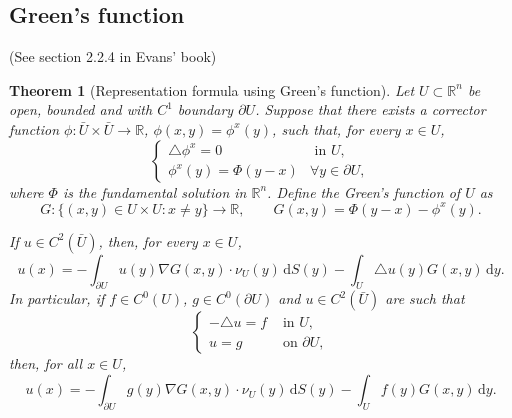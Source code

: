 \documentclass[a4paper,9pt]{amsart}
\newcommand{\R}{\mathbb{R}}	%
\newcommand{\did}{\,\mathrm{d}}	%
\newcommand{\de}{\partial}		%
\newcommand{\laplacian}{\triangle}
\newcommand{\grad}{\nabla}
\theoremstyle{plain}
\newtheorem{theorem}[proposition]{Theorem}
\theoremstyle{definition}
\theoremstyle{remark}
\begin{document}
\subsection{Green's function}\label{subs67bb7d34}
(See section 2.2.4 in Evans' book)

\begin{theorem}[Representation formula using Green's function]\label{thm67bb7d61}
	Let $U\subset\R^n$ be open, bounded and with $C^1$ boundary $\de U$.
	Suppose that there exists a \emph{corrector function} $\phi:\bar U\times\bar U\to\R$, $\phi(x,y) = \phi^x(y)$, such that, for every $x\in U$,
	\begin{equation}\label{eq67bb7eeb}
	\begin{cases}
		\laplacian \phi^x = 0 & \text{ in }U , \\
		\phi^x(y) = \Phi(y-x) & \forall y\in\de U ,
	\end{cases}
	\end{equation}
	where $\Phi$ is the fundamental solution in $\R^n$.
	Define the \emph{Green's function of $U$} as 
	\begin{equation}
		G : \{(x,y)\in U\times U: x\neq y\} \to \R ,
		\qquad
		G(x,y) = \Phi(y-x) - \phi^x(y) .
	\end{equation}
	
	If $u\in C^2(\bar U)$, then, for every $x\in U$,
	\begin{equation}\label{eq67bb7ef3}
		u(x) = - \int_{\de U} u(y) \grad G(x,y) \cdot \nu_{U}(y) \did S(y)
			- \int_U \laplacian u(y) G(x,y) \did y .
	\end{equation}
	In particular, if $f\in C^0(U)$, $g\in C^0(\de U)$ and $u\in C^2(\bar U)$ are such that
	\begin{equation}\label{eq67bb7ef9}
	\begin{cases}
		- \laplacian u = f & \text{ in }U , \\
		u = g & \text{ on }\de U ,
	\end{cases}
	\end{equation}
	then, for all $x\in U$,
	\begin{equation}\label{eq67bb7f00}
		u(x) = - \int_{\de U} g(y) \grad G(x,y) \cdot \nu_{U}(y) \did S(y)
			- \int_U f(y) G(x,y) \did y .
	\end{equation}
\end{theorem}
\end{document}
